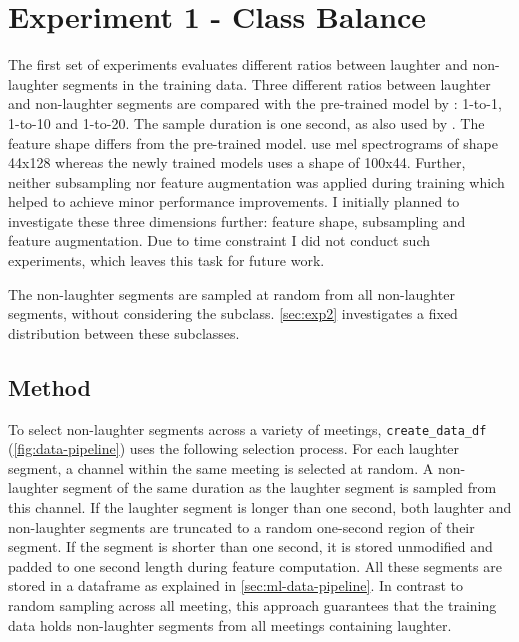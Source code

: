 \documentclass[bsc,frontabs,parskip,deptreport]{infthesis}
\begin{document}
\section{Experiment 1 - Class Balance} \label{sec:exp-1}
The first set of experiments evaluates different ratios between laughter and non-laughter segments in the training data.
Three different ratios between laughter and non-laughter segments are compared with the pre-trained model by \citet{gillick2021robust}: 1-to-1, 1-to-10 and 1-to-20.
The sample duration is one second, as also used by \citet{gillick2021robust}. The feature shape differs from the pre-trained model. \citet{gillick2021robust} use mel spectrograms of shape 44x128 whereas the newly trained models uses a shape of 100x44.
Further, neither subsampling nor feature augmentation was applied during training which helped \citet{gillick2021robust} to achieve minor performance improvements.
I initially planned to investigate these three dimensions further: feature shape, subsampling and feature augmentation. 
Due to time constraint I did not conduct such experiments, which leaves this task for future work. 

The non-laughter segments are sampled at random from all non-laughter segments, without considering the subclass. 
\autoref{sec:exp2} investigates a fixed distribution between these subclasses. 


\subsection{Method}
To select non-laughter segments across a variety of meetings, \verb|create_data_df| (\autoref{fig:data-pipeline}) uses the following selection process.
For each laughter segment, a channel within the same meeting is selected at random.
A non-laughter segment of the same duration as the laughter segment is sampled from this channel.
If the laughter segment is longer than one second, both laughter and non-laughter segments are truncated to a random one-second region of their segment. 
If the segment is shorter than one second, it is stored unmodified and padded to one second length during feature computation.
All these segments are stored in a dataframe as explained in \autoref{sec:ml-data-pipeline}.
In contrast to random sampling across all meeting, this approach guarantees that the training data holds non-laughter segments from all meetings containing laughter. 
\end{document}
